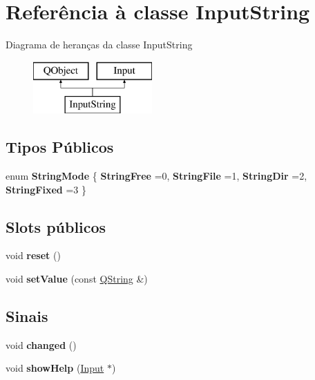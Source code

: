 \hypertarget{class_input_string}{\section{Referência à classe Input\-String}
\label{class_input_string}
}
Diagrama de heranças da classe Input\-String\begin{figure}[H]
\begin{center}
\leavevmode
\includegraphics[height=2.000000cm]{class_input_string}
\end{center}
\end{figure}
\subsection*{Tipos Públicos}
\begin{DoxyCompactItemize}
\item 
enum {\bfseries String\-Mode} \{ {\bfseries String\-Free} =0, 
{\bfseries String\-File} =1, 
{\bfseries String\-Dir} =2, 
{\bfseries String\-Fixed} =3
 \}
\end{DoxyCompactItemize}
\subsection*{Slots públicos}
\begin{DoxyCompactItemize}
\item 
\hypertarget{class_input_string_ad20897c5c8bd47f5d4005989bead0e55}{void {\bfseries reset} ()}\label{class_input_string_ad20897c5c8bd47f5d4005989bead0e55}

\item 
\hypertarget{class_input_string_a67f8a02b574a45c9067e3e5ba33e7b8c}{void {\bfseries set\-Value} (const \hyperlink{class_q_string}{Q\-String} \&)}\label{class_input_string_a67f8a02b574a45c9067e3e5ba33e7b8c}

\end{DoxyCompactItemize}
\subsection*{Sinais}
\begin{DoxyCompactItemize}
\item 
\hypertarget{class_input_string_a5d42414aede4a6105b6956c0aca81fa0}{void {\bfseries changed} ()}\label{class_input_string_a5d42414aede4a6105b6956c0aca81fa0}

\item 
\hypertarget{class_input_string_af32333a92f81f1f8570f1ddc0e5443d5}{void {\bfseries show\-Help} (\hyperlink{class_input}{Input} $\ast$)}\label{class_input_string_af32333a92f81f1f8570f1ddc0e5443d5}

\end{DoxyCompactItemize}

